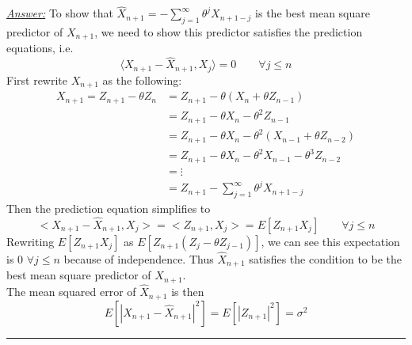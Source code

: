 \documentclass[a4paper, 11pt]{article}
\begin{document}
\begin{itemize}
	\underline{\emph{Answer:}} To show that $\hat{X}_{n+1} = -\sum^{\infty}_{j=1}\theta^jX_{n+1-j}$ is the best mean square predictor of $X_{n+1}$, we need to show this predictor satisfies the prediction equations, i.e. 
\[ \langle X_{n+1} - \hat{X}_{n+1}, X_j \rangle = 0 \quad \quad \forall j \leq n\]
First rewrite $X_{n+1}$ as the following:
\begin{align*}
X_{n+1} = Z_{n+1} - \theta Z_n &= Z_{n+1} - \theta(X_n + \theta Z_{n-1}) \\
&= Z_{n+1} - \theta X_n - \theta^2 Z_{n-1} \\
&= Z_{n+1} - \theta X_n - \theta^2(X_{n-1} + \theta Z_{n-2}) \\
&= Z_{n+1} - \theta X_n - \theta^2 X_{n-1} - \theta^3 Z_{n-2}\\
&= \vdots \\
&= Z_{n+1} - \sum^{\infty}_{j=1}\theta^jX_{n+1-j}
\end{align*}
Then the prediction equation simplifies to
\[ <X_{n+1} - \hat{X}_{n+1}, X_j>  = <Z_{n+1},X_j> = E[Z_{n+1}X_j] \quad \quad \forall j \leq n \]
Rewriting $E[Z_{n+1}X_j]$ as $E[Z_{n+1}(Z_j - \theta Z_{j-1})]$, we can see this expectation is 0 $\forall j \leq n$ because of independence. Thus $\hat{X}_{n+1}$ satisfies the condition to be the best mean square predictor of $X_{n+1}$. \\
The mean squared error of $\hat{X}_{n+1}$ is then
\[
E[|X_{n+1} - \hat{X}_{n+1}|^2] = E[|Z_{n+1}|^2] = \sigma^2
\]
	
	\hrule 


\end{itemize}	
\end{document}
